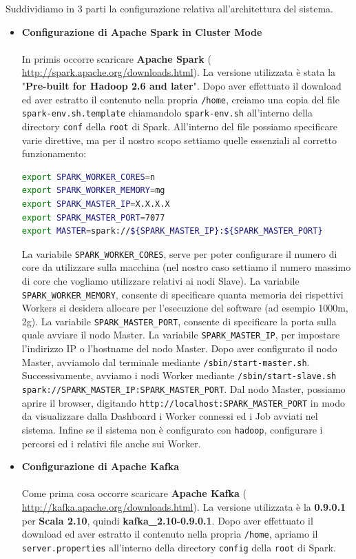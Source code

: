\documentclass[12pt]{article}
\begin{document}
Suddividiamo in 3 parti la configurazione relativa all'architettura del sistema.
\begin{itemize}
\item {\textbf{Configurazione di Apache Spark in Cluster Mode}}\\\\
In primis occorre scaricare \textbf{Apache Spark} ( \href{http://spark.apache.org/downloads.html}{http://spark.apache.org/downloads.html}). La versione utilizzata è stata la "\textbf{Pre-built for Hadoop 2.6 and later}".
Dopo aver effettuato il download ed aver estratto il contenuto nella propria \texttt{/home}, creiamo una copia del file \texttt{spark-env.sh.template} chiamandolo \texttt{spark-env.sh} all'interno della directory \texttt{conf} della \texttt{root} di Spark. All'interno del file possiamo specificare varie direttive, ma per il nostro scopo settiamo quelle essenziali al corretto funzionamento:
\begin{lstlisting}[language=bash, caption=spark-env.sh]
export SPARK_WORKER_CORES=n
export SPARK_WORKER_MEMORY=mg
export SPARK_MASTER_IP=X.X.X.X
export SPARK_MASTER_PORT=7077
export MASTER=spark://${SPARK_MASTER_IP}:${SPARK_MASTER_PORT}
\end{lstlisting}
La variabile \texttt{SPARK\_WORKER\_CORES}, serve per poter configurare il numero di core da utilizzare sulla macchina (nel nostro caso settiamo il numero massimo di core che vogliamo utilizzare relativi ai nodi Slave).
La variabile \texttt{SPARK\_WORKER\_MEMORY}, consente di specificare quanta memoria dei rispettivi Workers si desidera allocare per l'esecuzione del software (ad esempio 1000m, 2g).
La variabile \texttt{SPARK\_MASTER\_PORT}, consente di specificare la porta sulla quale avviare il nodo Master.
La variabile \texttt{SPARK\_MASTER\_IP}, per impostare l'indirizzo IP o l'hostname del nodo Master. 
Dopo aver configurato il nodo Master, avviamolo dal terminale mediante \texttt{/sbin/start-master.sh}.
Successivamente, avviamo i nodi Worker mediante \texttt{/sbin/start-slave.sh spark://SPARK\_MASTER\_IP:SPARK\_MASTER\_PORT}.
Dal nodo Master, possiamo aprire il browser, digitando \texttt{http://localhost:SPARK\_MASTER\_PORT} in modo da visualizzare dalla Dashboard i Worker connessi ed i Job avviati nel sistema.
Infine se il sistema non è configurato con \texttt{hadoop}, configurare i percorsi ed i relativi file anche sui Worker.

\item {\textbf{Configurazione di Apache Kafka}}\\\\
Come prima cosa occorre scaricare \textbf{Apache Kafka} ( \href{http://kafka.apache.org/downloads.html}{http://kafka.apache.org/downloads.html}). La versione utilizzata è la \textbf{0.9.0.1} per \textbf{Scala 2.10}, quindi \textbf{kafka\_2.10-0.9.0.1}. Dopo aver effettuato il download ed aver estratto il contenuto nella propria \texttt{/home}, apriamo il \texttt{server.properties} all'interno della directory \texttt{config} della \texttt{root} di Spark.


\end{itemize}
\end{document}
